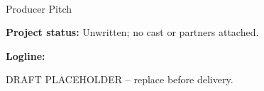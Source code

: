 \documentclass[11pt,letterpaper]{article}
\begin{document}
\begin{center}
{\Large\bfseries\sffamily \filmtitleupper}\\[6pt]
Producer Pitch
\end{center}
\textbf{Project status:} Unwritten; no cast or partners attached.

\textbf{Logline:} \filmlogline

DRAFT PLACEHOLDER -- replace before delivery.
\end{document}
